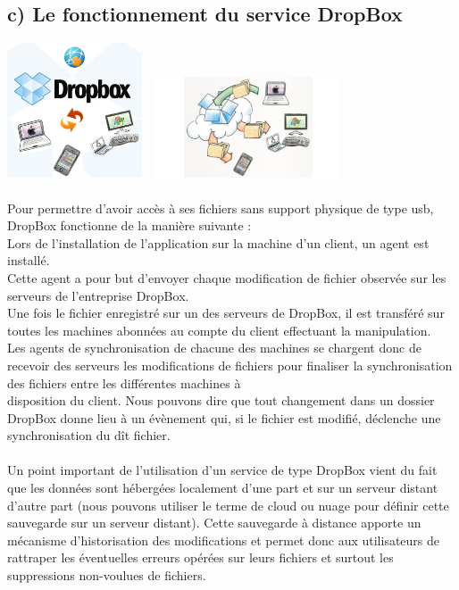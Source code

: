 \documentclass[a4paper, 10pt]{article}
\begin{document}
\subsection*{c) Le fonctionnement du service DropBox}
\includegraphics[height = 4cm, width = 4cm]{jpg/dropbox_1.png}
\includegraphics[height = 3cm, width = 6cm]{jpg/dropbox_3.jpg}\\ \\
Pour permettre d'avoir acc\`es \`a ses fichiers sans support physique de type usb, DropBox fonctionne de la mani\`ere suivante :\\
Lors de l'installation de l'application sur la machine d'un client, un agent est install\'e.\\
Cette agent a pour but d'envoyer chaque modification de fichier observ\'ee sur les serveurs de l'entreprise DropBox.\\
Une fois le fichier enregistr\'e sur un des serveurs de DropBox, il est transf\'er\'e sur toutes les machines abonn\'ees
au compte du client effectuant la manipulation.\\
Les agents de synchronisation de chacune des machines se chargent donc de recevoir des serveurs les modifications de fichiers pour
finaliser la synchronisation des fichiers entre les diff\'erentes machines \`a\\disposition du client.
Nous pouvons dire que tout changement dans un dossier DropBox donne lieu \`a un \'ev\`enement qui, si le fichier est modifi\'e,
d\'eclenche une synchronisation du d\^it fichier.\\ \\
Un point important de l'utilisation d'un service de type DropBox vient du fait que les donn\'ees sont h\'eberg\'ees localement d'une part
et sur un serveur distant d'autre part (nous pouvons utiliser le terme de cloud ou nuage pour d\'efinir cette sauvegarde sur un serveur distant).
Cette sauvegarde \`a distance apporte un m\'ecanisme d'historisation des modifications et 
permet donc aux utilisateurs de rattraper les \'eventuelles erreurs op\'er\'ees sur leurs fichiers et
surtout les suppressions non-voulues de fichiers.
\end{document}
